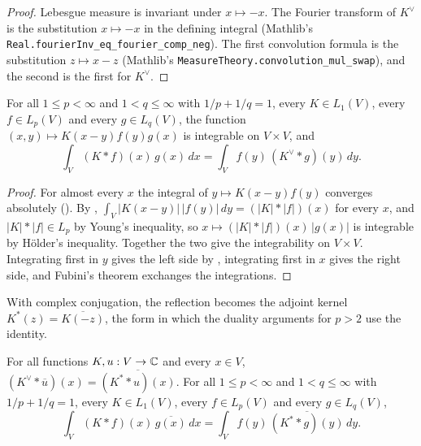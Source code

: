 \begin{proof}
\leanok
Lebesgue measure is invariant under $x \mapsto -x$. The Fourier transform of $K^\vee$ is the
substitution $x \mapsto -x$ in the defining integral (Mathlib's
\texttt{Real.\allowbreak fourierInv\_eq\_fourier\_comp\_neg}). The first convolution formula is
the substitution $z \mapsto x - z$ (Mathlib's
\texttt{MeasureTheory.\allowbreak convolution\_mul\_swap}), and the second is the first for
$K^\vee$.
\end{proof}

\begin{theorem}
\label{thm:convolution-adjoint}
\leanok
{}
For all $1 \leq p < \infty$ and $1 < q \leq \infty$ with $1/p + 1/q = 1$, every $K \in L_1(V)$,
every $f \in L_p(V)$ and every $g \in L_q(V)$, the function
$(x, y) \mapsto K(x - y) f(y) g(x)$ is integrable on $V \times V$, and
\[
  \int_V (K * f)(x) \, g(x) \, dx = \int_V f(y) \, (K^\vee * g)(y) \, dy .
\]
\end{theorem}

\begin{proof}
\leanok
For almost every $x$ the integral of $y \mapsto K(x - y) f(y)$ converges absolutely
(). By ,
$\int_V |K(x - y)| \, |f(y)| \, dy = (|K| * |f|)(x)$ for every $x$, and $|K| * |f| \in L_p$ by
Young's inequality, so $x \mapsto (|K| * |f|)(x) \, |g(x)|$ is integrable by H\"older's
inequality. Together the two give the integrability on $V \times V$. Integrating first in $y$
gives the left side by , integrating first in $x$ gives the right side,
and Fubini's theorem exchanges the integrations.
\end{proof}

With complex conjugation, the reflection becomes the adjoint kernel
$K^*(z) = \overline{K(-z)}$, the form in which the duality arguments for $p > 2$ use the
identity.

\begin{corollary}
\label{cor:convolution-adjoint-conj}
\leanok
{}
For all functions $K, u : V \to \mathbb{C}$ and every $x \in V$,
$(K^\vee * \overline u)(x) = \overline{(K^* * u)(x)}$. For all $1 \leq p < \infty$ and
$1 < q \leq \infty$ with $1/p + 1/q = 1$, every $K \in L_1(V)$, every $f \in L_p(V)$ and every
$g \in L_q(V)$,
\[
  \int_V (K * f)(x) \, \overline{g(x)} \, dx
  = \int_V f(y) \, \overline{(K^* * g)(y)} \, dy .
\]
\end{corollary}

